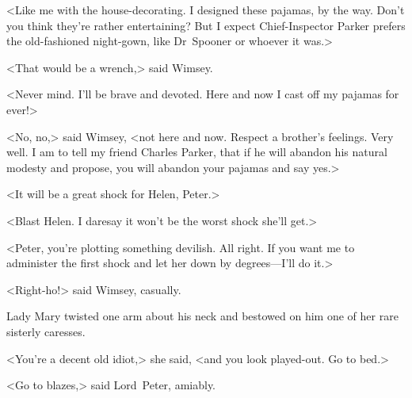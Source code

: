 <Like me with the house-decorating. I designed these pajamas, by the way. Don't you think they're rather entertaining? But I expect Chief-Inspector Parker prefers the old-fashioned night-gown, like Dr~Spooner or whoever it was.>

<That would be a wrench,> said Wimsey.

<Never mind. I'll be brave and devoted. Here and now I cast off my pajamas for ever!>

<No, no,> said Wimsey, <not here and now. Respect a brother's feelings. Very well. I am to tell my friend Charles Parker, that if he will abandon his natural modesty and propose, you will abandon your pajamas and say yes.>

<It will be a great shock for Helen, Peter.>

<Blast Helen. I daresay it won't be the worst shock she'll get.>

<Peter, you're plotting something devilish. All right. If you want me to administer the first shock and let her down by degrees—I'll do it.>

<Right-ho!> said Wimsey, casually.

Lady Mary twisted one arm about his neck and bestowed on him one of her rare sisterly caresses.

<You're a decent old idiot,> she said, <and you look played-out. Go to bed.>

<Go to blazes,> said Lord~Peter, amiably.